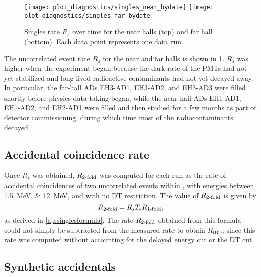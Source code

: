 \begin{figure}
    \centering
    \texttt{[image: plot\_diagnostics/singles\_near\_bydate]}
    \texttt{[image: plot\_diagnostics/singles\_far\_bydate]}
    \caption[Singles rate over time]{
        Singles rate $R_s$ over time for
        the near halls (top) and far hall (bottom).
        Each data point represents one data run.
    }
    \label{fig:singles}
\end{figure}

The uncorrelated event rate $R_s$ for the near and far halls is shown in
\cref{fig:singles}.
$R_s$ was higher when the experiment began because
the dark rate of the PMTs had not yet stabilized
and long-lived
radioactive contaminants had not yet decayed away.
In particular, the far-hall ADs EH3-AD1, EH3-AD2, and EH3-AD3
were filled shortly before physics data taking began,
while the near-hall ADs EH1-AD1, EH1-AD2, and EH2-AD1
were filled and then studied for a few months
as part of detector commissioning, during which time
most of the radiocontaminants decayed.

\subsection{Accidental coincidence rate}
\label{subsec:2fold}

Once $R_s$ was obtained, $R_{\text{\ensuremath{2}-fold}}$ was computed for each run
as the rate of accidental coincidences of two uncorrelated events within \tc{},
with energies between \SIlist{1.5;12}{\MeV}, and with no DT restriction.
The value of $R_\text{\ensuremath{2}-fold}$ is given by
\begin{equation}
    \label{eq:racc}
        R_{\text{\ensuremath{2}-fold}} = R_sT_c R_{\text{\ensuremath{1}-fold}},
\end{equation}
as derived in \cref{ap:singlesformula}.
The rate $R_{\text{\ensuremath{2}-fold}}$ obtained from this formula
could not simply be subtracted from the measured  rate
to obtain $R_{\text{IBD}}$,
since this rate was computed without accounting
for the delayed energy cut or the DT cut.

\subsection{Synthetic accidentals}
\label{subsec:synthetic}

